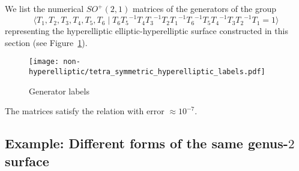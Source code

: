 \documentclass[Thesis]{subfiles}
\begin{document}
 We list the numerical $SO^{+}(2,1)$ matrices of the generators of the
group
\begin{equation}
  \label{eq:T-relation}
  \langle T_1,T_2,T_3,T_4,T_5,T_6 \mid
  T_{6}{T_{5}}^{-1}T_{4}{T_{3}}^{-1}T_{2}{T_{1}}^{-1}{T_{6}}^{-1}T_{5}{T_{4}}^{-1}T_{3}{T_{2}}^{-1}T_{1}=1
  \rangle
\end{equation}
representing the hyperelliptic elliptic-hyperelliptic surface
constructed in this section (see Figure~\ref{fig:elliptic-hyperelliptic-data}).
\begin{figure}[tb]
\centering
\texttt{[image: non-hyperelliptic/tetra\_symmetric\_hyperelliptic\_labels.pdf]}
\caption{Generator labels}
\label{fig:elliptic-hyperelliptic-data}
\end{figure}
The matrices satisfy the relation with error $\approx 10^{-7}$.

\begingroup
\allowdisplaybreaks

\endgroup

\subsection{Example: Different forms of the same genus-$2$ surface}
\label{sec:lawson_uniformization}
\end{document}

